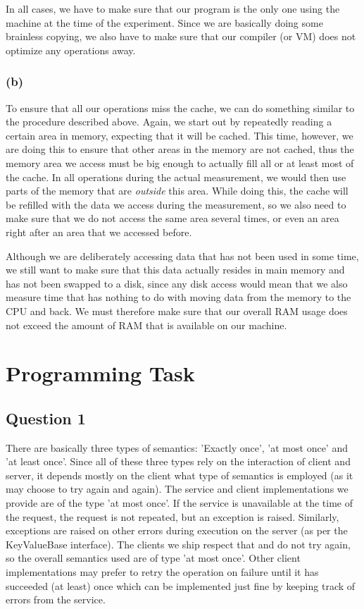 \documentclass[12pt,a4paper]{article}
\newcommand{\code}[1]{{\fontfamily{fvm}\small \selectfont #1}}
\begin{document}
In all cases, we have to make sure that our program is the only one using the machine at the time of the experiment. Since we are basically doing some brainless copying, we also have to make sure that our compiler (or VM) does not optimize any operations away.

\subsubsection*{(b)}
To ensure that all our operations miss the cache, we can do something similar to the procedure described above. Again, we start out by repeatedly reading a certain area in memory, expecting that it will be cached. This time, however, we are doing this to ensure that other areas in the memory are not cached, thus the memory area we access must be big enough to actually fill all or at least most of the cache. In all operations during the actual measurement, we would then use parts of the memory that are \emph{outside} this area. While doing this, the cache will be refilled with the data we access during the measurement, so we also need to make sure that we do not access the same area several times, or even an area right after an area that we accessed before.

Although we are deliberately accessing data that has not been used in some time, we still want to make sure that this data actually resides in main memory and has not been swapped to a disk, since any disk access would mean that we also measure time that has nothing to do with moving data from the memory to the CPU and back. We must therefore make sure that our overall RAM usage does not exceed the amount of RAM that is available on our machine.

\section*{Programming Task}
\label{sec:programming}

\subsection*{Question 1}
\label{sec:pq1}
There are basically three types of semantics: 'Exactly once', 'at most once' and 'at least once'. Since all of these three types rely on the interaction of client and server, it depends mostly on the client what type of semantics is employed (as it may choose to try again and again). The service and client implementations we provide are of the type 'at most once'. If the service is unavailable at the time of the request, the request is not repeated, but an exception is raised. Similarly, exceptions are raised on other errors during execution on the server (as per the \code{KeyValueBase} interface). The clients we ship respect that and do not try again, so the overall semantics used are of type 'at most once'. Other client implementations may prefer to retry the operation on failure until it has succeeded (at least) once which can be implemented just fine by keeping track of errors from the service.
\end{document}
